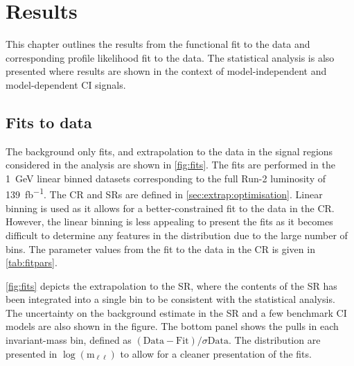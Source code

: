 \chapter{Results}\label{chap:results}
This chapter outlines the results from the functional fit to the data and corresponding profile likelihood fit to the data. The statistical analysis is also presented where results are shown in the context of model-independent and model-dependent CI signals. 

\section{Fits to data}
The background only fits, and extrapolation to the data in the signal regions considered in the analysis are shown in \cref{fig:fits}. The fits are performed in the \SI{1}{\giga\electronvolt} linear binned datasets corresponding to the full Run-2 luminosity of \SI{139}{\femto\barn^{-1}}. The CR and SRs are defined in \cref{sec:extrap:optimisation}. Linear binning is used as it allows for a better-constrained fit to the data in the CR. However, the linear binning is less appealing to present the fits as it becomes difficult to determine any features in the distribution due to the large number of bins. The parameter values from the fit to the data in the CR is given in \cref{tab:fitpars}. 

\cref{fig:fits} depicts the extrapolation to the SR, where the contents of the SR has been integrated into a single bin to be consistent with the statistical analysis. The uncertainty on the background estimate in the SR and a few benchmark CI models are also shown in the figure. The bottom panel shows the pulls in each invariant-mass bin, defined as $(\mathrm{Data}-\mathrm{Fit})/\sigma\mathrm{Data}$. The distribution are presented in $\log{(\text{m}_{\ell\ell})}$ to allow for a cleaner presentation of the fits. 

